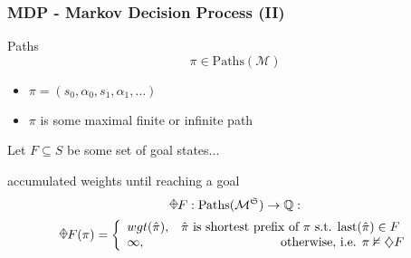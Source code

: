\documentclass[onlymath]{beamer}
\begin{document}
\newcommand{\rawdiaplus}{%
	\begin{tikzpicture}
	\useasboundingbox (-0.7ex, -0.9ex) rectangle (0.7ex, 0.9ex);
	\node (w) at (-0.7ex,0) {};
	\node (e) at (+0.7ex,0) {};
	\node (s) at (0,-0.9ex) {};
	\node (n) at (0,+0.9ex) {};
	\draw (n.center) -- (e.center) -- (s.center) -- (w.center) -- (n.center);
	\draw (n.center) -- (s.center);
	\draw (e.center) -- (w.center);
	\end{tikzpicture}
}
\begin{frame}
	\frametitle{MDP - Markov Decision Process (II)}
	\begin{block}{Paths}
		\[
			\pi \in \mathrm{Paths}(\mathcal{M})
		\] \pause \begin{itemize}
			\item $\pi = (s_0,\alpha_0,s_1,\alpha_1, \dots)$ \pause
			\item $\pi$ is some maximal finite or infinite path \pause
		\end{itemize}
	\end{block}
	Let $F \subseteq S$ be some set of goal states... \pause
	\begin{block}{accumulated weights until reaching a goal}
	\[
	\rawdiaplus F : \mathrm{Paths}(\mathcal{M}^{\mathfrak{S}}) \to \mathbb{Q} :
	\]
	\[ 
	\rawdiaplus F (\pi) = \bigg\{\begin{array}{lr}
	wgt(\hat{\pi}), & \text{$\hat{\pi}$ is shortest prefix of $\pi$ s.t. $\mathrm{last}(\hat{\pi}) \in F$  }\\
	\infty, & \text{otherwise, i.e. $\pi \nvDash \diamondsuit F$}
	\end{array}
	\]
	\end{block}

\end{frame}
\begin{comment}
	
\section{Essential Definitions}

\begin{frame}
\begin{itemize}
	\item MDP
	\item Expectation
	\item Conditional Expectation
	\item Variance-penalized Expectation
	\item schedulers, kind of schedulers...
\end{itemize}
\end{frame}
\end{comment}
\end{document}
